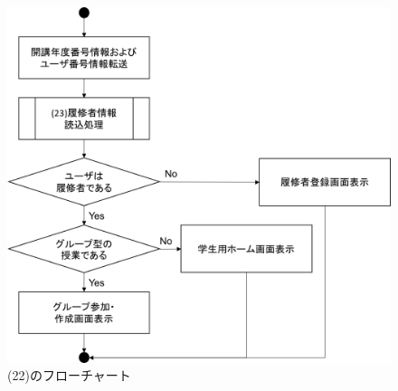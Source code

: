 \begin{figure}[htbp]
  \begin{center}
    \includegraphics[width=0.75\linewidth,clip]{./img/flow/22.png}
    \caption{(22)のフローチャート}\label{fig:22}
  \end{center}
\end{figure}

